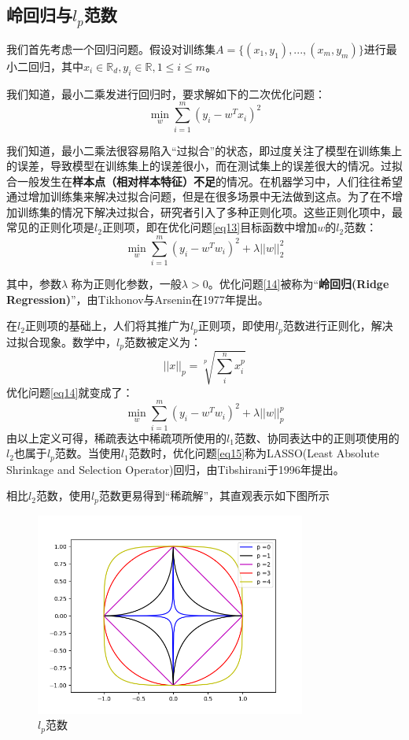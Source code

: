 \documentclass[12pt,a4paper]{article}
\begin{document}
\subsection{岭回归与$l_{p}$范数}
我们首先考虑一个回归问题。假设对训练集$A = \{(x_{1}, y_{1}), ... , (x_{m}, y_{m})\}$进行最小二回归，其中$x_{i} \in \mathbb{R}_{d}, y_{i} \in \mathbb{R}, 1 \leq i \leq m$。

我们知道，最小二乘发进行回归时，要求解如下的二次优化问题：
\begin{equation}
\label{eq13}
\min_{w} \sum_{i = 1}^{m} (y_{i} - w^{T}x_{i})^2
\end{equation}

我们知道，最小二乘法很容易陷入“过拟合”的状态，即过度关注了模型在训练集上的误差，导致模型在训练集上的误差很小，而在测试集上的误差很大的情况。过拟合一般发生在\textbf{样本点（相对样本特征）不足}的情况。在机器学习中，人们往往希望通过增加训练集来解决过拟合问题，但是在很多场景中无法做到这点。为了在不增加训练集的情况下解决过拟合，研究者引入了多种正则化项。这些正则化项中，最常见的正则化项是$l_{2}$正则项，即在优化问题\eqref{eq13}目标函数中增加$w$的$l_{2}$范数：
\begin{equation}
\label{eq14}
\min_{w} \sum_{i = 1}^{m} (y_{i} - w^{T}w_{i})^2 + \lambda||w||_{2}^{2}
\end{equation}

其中，参数$\lambda$ 称为正则化参数，一般$\lambda > 0$。优化问题\eqref{14}被称为“\textbf{岭回归(Ridge Regression)}”，由Tikhonov与Arsenin在1977年提出。

在$l_{2}$正则项的基础上，人们将其推广为$l_{p}$正则项，即使用$l_{p}$范数进行正则化，解决过拟合现象。数学中，$l_{p}$范数被定义为：
\begin{equation*}
||x||_{p} = \sqrt[p]{\sum_{i}^{n} x_{i}^{p}}
\end{equation*}
优化问题\eqref{eq14}就变成了：
\begin{equation}
\label{eq15}
\min_{w} \sum_{i = 1}^{m} (y_{i} - w^{T}w_{i})^2 + \lambda||w||_{p}^{p}
\end{equation}
由以上定义可得，稀疏表达中稀疏项所使用的$l_{1}$范数、协同表达中的正则项使用的$l_{2}$也属于$l_{p}$范数。当使用$l_{1}$范数时，优化问题\eqref{eq15}称为LASSO(Least Absolute Shrinkage and Selection Operator)回归，由Tibshirani于1996年提出。

相比$l_{2}$范数，使用$l_{p}$范数更易得到“稀疏解”，其直观表示如下图所示

\begin{figure}[H] 
\center
\includegraphics[width=3.5in]{lp_norm.png} 
\caption{$l_{p}$范数}\label{fig:1} 
\end{figure} 
\end{document}
